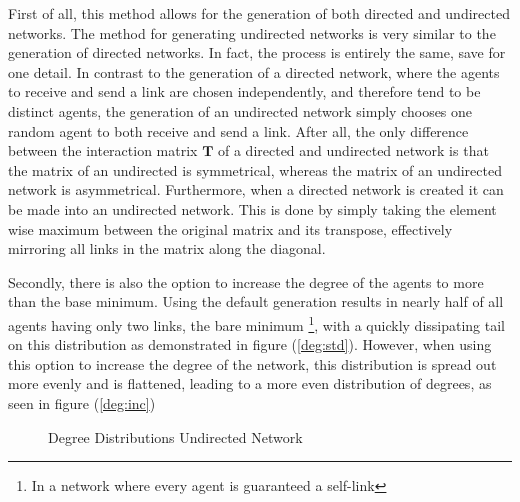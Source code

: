 \documentclass{article}
\newcommand{\T}{\textbf{T}}
\begin{document}
First of all, this method allows for the generation of both directed and undirected networks. The method for generating undirected networks is very similar to the generation of directed networks. In fact, the process is entirely the same, save for one detail. In contrast to the generation of a directed network, where the agents to receive and send a link are chosen independently, and therefore tend to be distinct agents, the generation of an undirected network simply chooses one random agent to both receive and send a link. After all, the only difference between the interaction matrix $\T$ of a directed and undirected network is that the matrix of an undirected is symmetrical, whereas the matrix of an undirected network is asymmetrical. \newline
Furthermore, when a directed network is created it can be made into an undirected network. This is done by simply taking the element wise maximum between the original matrix and its transpose, effectively mirroring all links in the matrix along the diagonal. \newline

Secondly, there is also the option to increase the degree of the agents to more than the base minimum. Using the default generation results in nearly half of all agents having only two links, the bare minimum \footnote{In a network where every agent is guaranteed a self-link}, with a quickly dissipating tail on this distribution as demonstrated in figure (\ref{deg:std}). However, when using this option to increase the degree of the network, this distribution is spread out more evenly and is flattened, leading to a more even distribution of degrees, as seen in figure (\ref{deg:inc})
\begin{figure}[!htbp]
  \centering
  \hfill
  \caption{Degree Distributions Undirected Network}
\end{figure}
\end{document}
